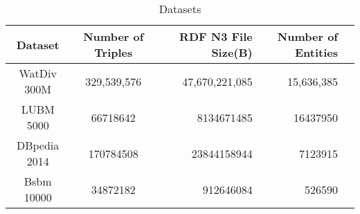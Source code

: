 \documentclass[titlepage, a4paper, 12pt]{article}
\begin{document}
\begin{table}[b]
	\small
	\centering
	\caption{Datasets}
	\begin{tabular}{|c|c|r|r|r|}
		\hline
		Dataset& Number of Triples& RDF N3 File Size(B)  & Number of Entities\\
		\hline  
		\hline
		WatDiv 300M & 329,539,576  & 47,670,221,085 & 15,636,385 \\
		\hline
		LUBM 5000 & 66718642 & 8134671485 & 16437950 \\
		\hline
		DBpedia 2014 & 170784508 & 23844158944 & 7123915 \\
		\hline
		Bsbm 10000 & 34872182 & 912646084  & 526590 \\
		\hline
	\end{tabular}
	\label{table:datasets}
\end{table}


\end{document}

